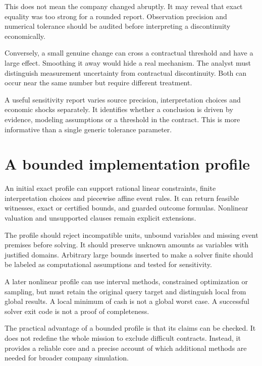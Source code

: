 This does not mean the company changed abruptly. It may reveal that exact equality was too strong for a rounded report. Observation precision and numerical tolerance should be audited before interpreting a discontinuity economically.

Conversely, a small genuine change can cross a contractual threshold and have a large effect. Smoothing it away would hide a real mechanism. The analyst must distinguish measurement uncertainty from contractual discontinuity. Both can occur near the same number but require different treatment.

A useful sensitivity report varies source precision, interpretation choices and economic shocks separately. It identifies whether a conclusion is driven by evidence, modeling assumptions or a threshold in the contract. This is more informative than a single generic tolerance parameter.

\section{A bounded implementation profile}
An initial exact profile can support rational linear constraints, finite interpretation choices and piecewise affine event rules. It can return feasible witnesses, exact or certified bounds, and guarded outcome formulas. Nonlinear valuation and unsupported clauses remain explicit extensions.

The profile should reject incompatible units, unbound variables and missing event premises before solving. It should preserve unknown amounts as variables with justified domains. Arbitrary large bounds inserted to make a solver finite should be labeled as computational assumptions and tested for sensitivity.

A later nonlinear profile can use interval methods, constrained optimization or sampling, but must retain the original query target and distinguish local from global results. A local minimum of cash is not a global worst case. A successful solver exit code is not a proof of completeness.

The practical advantage of a bounded profile is that its claims can be checked. It does not redefine the whole mission to exclude difficult contracts. Instead, it provides a reliable core and a precise account of which additional methods are needed for broader company simulation.


















